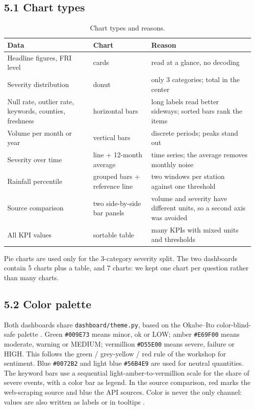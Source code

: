 \documentclass[stu, 12pt, letterpaper, donotrepeattitle, floatsintext, natbib]{apa7}
\begin{document}
\subsection{5.1 Chart types}
\begin{table}[H]
\centering
\scriptsize
\caption{Chart types and reasons.}
\label{tab:chart-reasons}
\begin{tabularx}{\textwidth}{>{\raggedright\arraybackslash}p{4.0cm} >{\raggedright\arraybackslash}p{3.0cm} >{\raggedright\arraybackslash}X}
\toprule
\textbf{Data} & \textbf{Chart} & \textbf{Reason} \\
\midrule
Headline figures, FRI level & cards & read at a glance, no decoding \\
Severity distribution & donut & only 3 categories; total in the center \\
Null rate, outlier rate, keywords, counties, freshness & horizontal bars & long labels read better sideways; sorted bars rank the items \citep{tufte2001} \\
Volume per month or year & vertical bars & discrete periods; peaks stand out \\
Severity over time & line + 12-month average & time series; the average removes monthly noise \\
Rainfall percentile & grouped bars + reference line & two windows per station against one threshold \\
Source comparison & two side-by-side bar panels & volume and severity have different units, so a second axis was avoided \\
All KPI values & sortable table & many KPIs with mixed units and thresholds \\
\bottomrule
\end{tabularx}
\end{table}

\noindent Pie charts are used only for the 3-category severity split. The two dashboards contain 5 charts plus a table, and 7 charts: we kept one chart per question rather than many charts.

\subsection{5.2 Color palette}
Both dashboards share \texttt{dashboard/theme.py}, based on the Okabe--Ito color-blind-safe palette \citep{okabe2008}. Green \texttt{\#009E73} means minor, ok or LOW; amber \texttt{\#E69F00} means moderate, warning or MEDIUM; vermillion \texttt{\#D55E00} means severe, failure or HIGH. This follows the green / grey-yellow / red rule of the workshop for sentiment. Blue \texttt{\#0072B2} and light blue \texttt{\#56B4E9} are used for neutral quantities. The keyword bars use a sequential light-amber-to-vermillion scale for the share of severe events, with a color bar as legend. In the source comparison, red marks the web-scraping source and blue the API sources. Color is never the only channel: values are also written as labels or in tooltips \citep{wcag21}.
\end{document}
